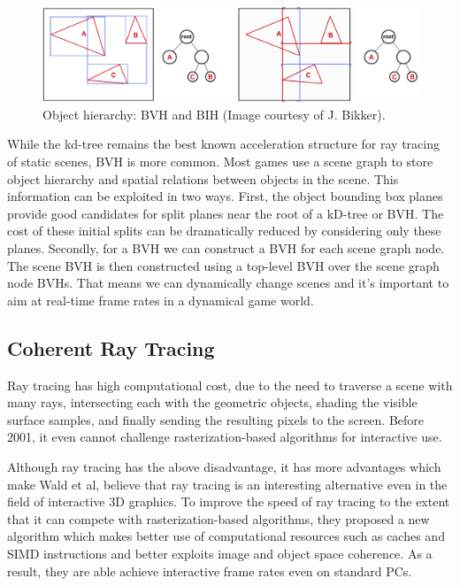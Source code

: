 \begin{figure}\label{f:object-subdivisions}
	\begin{center}
		\includegraphics[width=1.\textwidth]{graphics/gi/path-17-2}
	\end{center}
	\caption{Object hierarchy: BVH and BIH (Image courtesy of J. Bikker).}
\end{figure}

While the kd-tree remains the best known acceleration structure for ray tracing of static scenes, BVH is more common. Most games use a scene graph to store object hierarchy and spatial relations between objects in the scene. This information can be exploited in two ways. First, the object bounding box planes provide good candidates for split planes near the root of a kD-tree or BVH. The cost of these initial splits can be dramatically reduced by considering only these planes. Secondly, for a BVH we can construct a BVH for each scene graph node. The scene BVH is then constructed using a top-level BVH over the scene graph node BVHs. That means we can dynamically change scenes and it's important to aim at real-time frame rates in a dynamical game world.



\subsection{Coherent Ray Tracing}\label{sec:coherent-ray-tracing}
Ray tracing has high computational cost, due to the need to traverse a scene with many rays, intersecting each with the geometric objects, shading the visible surface samples, and finally sending the resulting pixels to the screen. Before 2001, it even cannot challenge rasterization-based algorithms for interactive use.

Although ray tracing has the above disadvantage, it has more advantages which make Wald et al, believe that ray tracing is an interesting alternative even in the field of interactive 3D graphics. To improve the speed of ray tracing to the extent that it can compete with rasterization-based algorithms, they proposed a new algorithm \cite{a:InteractiveRenderingwithCoherentRayTracing} which makes better use of computational resources such as caches and SIMD instructions and better exploits image and object space coherence. As a result, they are able achieve interactive frame rates even on standard PCs.

